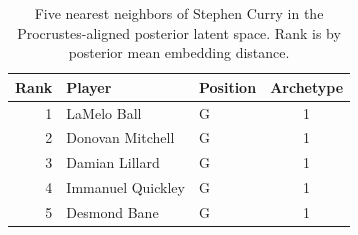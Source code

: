 \begin{table}[htbp]
  \centering\small
  \begin{tabular}{rllc}
    \toprule
    Rank & Player & Position & Archetype \\
    \midrule
    1 & LaMelo Ball & G & 1 \\
    2 & Donovan Mitchell & G & 1 \\
    3 & Damian Lillard & G & 1 \\
    4 & Immanuel Quickley & G & 1 \\
    5 & Desmond Bane & G & 1 \\
    \bottomrule
  \end{tabular}
  \caption{Five nearest neighbors of Stephen Curry in the Procrustes-aligned posterior latent space. Rank is by posterior mean embedding distance.}
  \label{tab:Stephen_Curry_neighbors}
\end{table}

